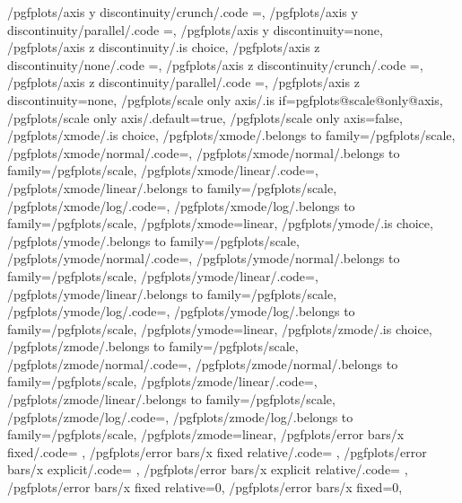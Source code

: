 {	/pgfplots/axis y discontinuity/crunch/.code	={\def\pgfplots@yaxisdiscontnum{1}},
	/pgfplots/axis y discontinuity/parallel/.code	={\def\pgfplots@yaxisdiscontnum{2}},
	/pgfplots/axis y discontinuity=none,
	/pgfplots/axis z discontinuity/.is choice,
	/pgfplots/axis z discontinuity/none/.code	={\def\pgfplots@zaxisdiscontnum{0}},
	/pgfplots/axis z discontinuity/crunch/.code	={\def\pgfplots@zaxisdiscontnum{1}},
	/pgfplots/axis z discontinuity/parallel/.code	={\def\pgfplots@zaxisdiscontnum{2}},
	/pgfplots/axis z discontinuity=none,
	/pgfplots/scale only axis/.is if=pgfplots@scale@only@axis,
	/pgfplots/scale only axis/.default=true,
	/pgfplots/scale only axis=false,
	/pgfplots/xmode/.is choice,
	/pgfplots/xmode/.belongs to family=/pgfplots/scale,
	/pgfplots/xmode/normal/.code={\pgfplots@xislineartrue},
	/pgfplots/xmode/normal/.belongs to family=/pgfplots/scale,
	/pgfplots/xmode/linear/.code={\pgfplots@xislineartrue},
	/pgfplots/xmode/linear/.belongs to family=/pgfplots/scale,
	/pgfplots/xmode/log/.code={\pgfplots@xislinearfalse},
	/pgfplots/xmode/log/.belongs to family=/pgfplots/scale,
	/pgfplots/xmode=linear,
	/pgfplots/ymode/.is choice,
	/pgfplots/ymode/.belongs to family=/pgfplots/scale,
	/pgfplots/ymode/normal/.code={\pgfplots@yislineartrue},
	/pgfplots/ymode/normal/.belongs to family=/pgfplots/scale,
	/pgfplots/ymode/linear/.code={\pgfplots@yislineartrue},
	/pgfplots/ymode/linear/.belongs to family=/pgfplots/scale,
	/pgfplots/ymode/log/.code={\pgfplots@yislinearfalse},
	/pgfplots/ymode/log/.belongs to family=/pgfplots/scale,
	/pgfplots/ymode=linear,
	/pgfplots/zmode/.is choice,
	/pgfplots/zmode/.belongs to family=/pgfplots/scale,
	/pgfplots/zmode/normal/.code={\pgfplots@zislineartrue},
	/pgfplots/zmode/normal/.belongs to family=/pgfplots/scale,
	/pgfplots/zmode/linear/.code={\pgfplots@zislineartrue},
	/pgfplots/zmode/linear/.belongs to family=/pgfplots/scale,
	/pgfplots/zmode/log/.code={\pgfplots@zislinearfalse},
	/pgfplots/zmode/log/.belongs to family=/pgfplots/scale,
	/pgfplots/zmode=linear,
	/pgfplots/error bars/x fixed/.code=				\def\pgfplots@errorbars@xfixed{#1}\def\pgfplots@errorbars@xmode{0},
	/pgfplots/error bars/x fixed relative/.code=		\def\pgfplots@errorbars@xrel{#1}\def\pgfplots@errorbars@xmode{1},
	/pgfplots/error bars/x explicit/.code=			\def\pgfplots@errorbars@xmode{2},
	/pgfplots/error bars/x explicit relative/.code=	\def\pgfplots@errorbars@xmode{3},
	/pgfplots/error bars/x fixed relative=0,
	/pgfplots/error bars/x fixed=0,
}
